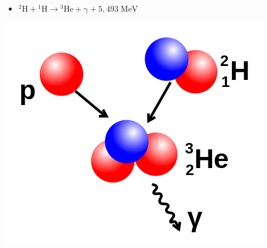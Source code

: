 \documentclass[10pt,a4paper, ngerman]{beamer}
\begin{document}
\begin{frame}{\subsecname}{\secname}
\begin{itemize}
\item \({\displaystyle \mathrm {{}^{2}H+{}^{1}H\to {}^{3}He+\gamma +5{,}493\;MeV} }\)
\end{itemize}
\centering
\includegraphics[height=0.5\textheight]{fids2}
\end{frame}
\end{document}
